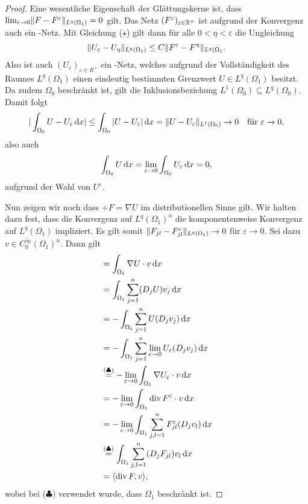 \begin{proof}
  Eine wesentliche Eigenschaft der Glättungskerne ist, dass $\lim_{\varepsilon \to 0} \lVert F - F^\varepsilon \rVert_{L^q(\Omega_1)} = 0$ gilt.
  Das Netz $(F^\varepsilon)_{\varepsilon \in \mathbb{R}^+}$ ist aufgrund der Konvergenz auch ein \cauchy-Netz.
  Mit Gleichung ($\star$) gilt dann für alle $0 < \eta < \varepsilon$ die Ungleichung
  $$
    \lVert U_\varepsilon - U_\eta \rVert_{L^q(\Omega_1)}
    \leq C \lVert F^\varepsilon - F^\eta \rVert_{L^q(\Omega_1}.
  $$
  Also ist auch $(U_\varepsilon)_{\varepsilon \in R^+}$ ein \cauchy-Netz, welches aufgrund der Vollständigkeit des Raumes $L^q(\Omega_1)$ einen eindeutig bestimmten Grenzwert $U \in L^q(\Omega_1)$ besitzt.
  Da zudem $\Omega_0$ beschränkt ist, gilt die Inklusionsbeziehung $L^1(\Omega_0) \subseteq L^q(\Omega_0)$.
  Damit folgt
  $$
    | \int_{\Omega_0} U - U_\varepsilon \, {\operatorname{d}\!{x}} |
    \leq  \int_{\Omega_0} | U - U_\varepsilon | \, {\operatorname{d}\!{x}} 
    = \lVert U - U_\varepsilon \rVert_{L^1(\Omega_0)} 
    \to 0 \quad\text{für } \varepsilon \to 0,
  $$
  also auch
  $$
    \int_{\Omega_0} U \, {\operatorname{d}\!{x}} = \lim_{\varepsilon \to 0} \int_{\Omega_0} U_\varepsilon \, {\operatorname{d}\!{x}} =  0,
  $$
  aufgrund der Wahl von $U^\varepsilon$.

  Nun zeigen wir noch dass $\div F = \nabla U$ im distributionellen Sinne gilt. 
  Wir halten dazu fest, dass die Konvergenz auf $L^q(\Omega_1)^n$ die komponentenweise Konvergenz auf $L^q(\Omega_1)$ impliziert.
  Es gilt somit $\lVert F_{jl} - F_{jl}^\varepsilon \rVert_{L^q(\Omega_1)} \to 0$ für $\varepsilon \to 0$.
  Sei dazu $v \in C_0^\infty(\Omega_1)^n$.
  Dann gilt
  \begin{align*}
    [\nabla U, v]
    &= \int_{\Omega_1} \nabla U \cdot v \d x \\
    &= \int_{\Omega_1} \sum_{j = 1}^n (D_j U) v_j \d x \\
    &= -\int_{\Omega_1} \sum_{j = 1}^n U (D_j v_j) \d x \\ 
    &= -\int_{\Omega_1} \sum_{j = 1}^n \lim_{\varepsilon \to 0} U_\varepsilon (D_j v_j) \d x \\
    &\overset{(\clubsuit)}{=} -\lim_{\varepsilon \to 0} \int_{\Omega_1} \nabla U_\varepsilon \cdot v \d x \\
    &= -\lim_{\varepsilon \to 0} \int_{\Omega_1} \div F^\varepsilon \cdot v \d x \\
    &= -\lim_{\varepsilon \to 0} \int_{\Omega_1} \sum_{j,l=1}^n F_{jl}^\varepsilon (D_j v_l) \d x \\
    &\overset{(\clubsuit)}{=} \int_{\Omega_1} \sum_{j,l=1}^n (D_j F_{jl}) v_l \d x \\
    &= \langle \div F, v \rangle,
  \end{align*}
  wobei bei ($\clubsuit$) verwendet wurde, dass $\Omega_1$ beschränkt ist.
\end{proof}
